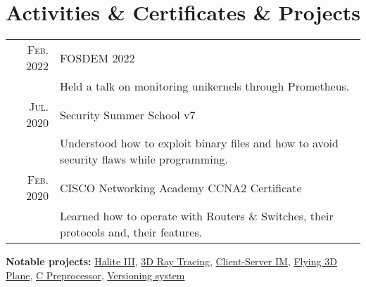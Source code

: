 \documentclass[a4paper,10pt]{article}
\begin{document}

\section{Activities \& Certificates \& Projects }
\begin{tabular}{rl}
	\textsc{Feb.} 2022 & FOSDEM 2022 \\&
		\textbullet\enspace\enspace Held a talk on monitoring unikernels through Prometheus. \\
	\textsc{Jul.} 2020 & Security Summer School v7 \\&
		\textbullet\enspace\enspace Understood how to exploit binary files and how to avoid security flaws while programming. \\
	\textsc{Feb.} 2020 & CISCO Networking Academy CCNA2 Certificate \\&
		\textbullet\enspace\enspace Learned how to operate with Routers \& Switches, their protocols and, their features.
\end{tabular}

\begin{flushleft}
	\textbf{Notable projects:}
		\href{https://github.com/craciunoiuc/Halite-III}{Halite III},
		\href{https://github.com/craciunoiuc/computer-graphics-2}{3D Ray Tracing},
		\href{https://github.com/craciunoiuc/network-protocols/tree/master/Client%20-%20Server}{Client-Server IM},
		\href{https://github.com/craciunoiuc/computer-graphics/tree/master/Source/Teme/Flying%203D%20Plane}{Flying 3D Plane},
		\href{https://github.com/craciunoiuc/operating-systems/tree/master/1-multi}{C Preprocessor},
		\href{https://github.com/craciunoiuc/oop-homework/tree/master/Version%20Control%20System}{Versioning system}
\end{flushleft}
\end{document}
